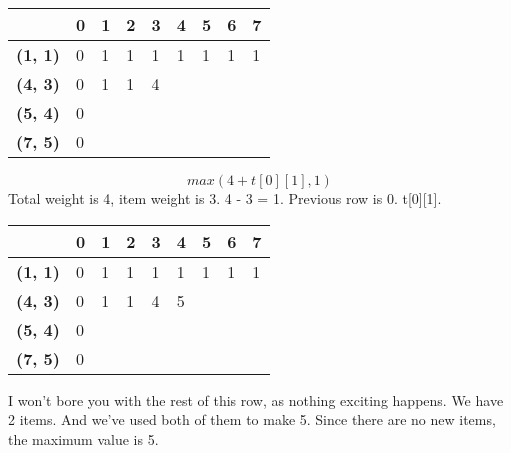 \documentclass{article}
\begin{document}
\begin{center}
\begin{tabular}{|l|l|l|l|l|l|l|l|l|}
\hline
                & \textbf{0} & \textbf{1} & \textbf{2} & \textbf{3} & \textbf{4} & \textbf{5} & \textbf{6} & \textbf{7} \\ \hline
\textbf{(1, 1)} & 0          &1            &1            &1            &1            &1            &1            &1            \\ \hline
\textbf{(4, 3)} & 0          &1            &1            &4            &            &            &            &            \\ \hline
\textbf{(5, 4)} & 0          &            &            &            &            &            &            &            \\ \hline
\textbf{(7, 5)} & 0          &            &            &            &            &            &            &            \\ \hline
\end{tabular}
\end{center}
$$max(4 + t[0][1], 1)$$
Total weight is 4, item weight is 3. 4 - 3 = 1. Previous row is 0. t[0][1].
\begin{center}
\begin{tabular}{|l|l|l|l|l|l|l|l|l|}
\hline
                & \textbf{0} & \textbf{1} & \textbf{2} & \textbf{3} & \textbf{4} & \textbf{5} & \textbf{6} & \textbf{7} \\ \hline
\textbf{(1, 1)} & 0          &1            &1            &1            &1            &1            &1            &1            \\ \hline
\textbf{(4, 3)} & 0          &1            &1            &4            &5            &            &            &            \\ \hline
\textbf{(5, 4)} & 0          &            &            &            &            &            &            &            \\ \hline
\textbf{(7, 5)} & 0          &            &            &            &            &            &            &            \\ \hline
\end{tabular}
\end{center}
I won't bore you with the rest of this row, as nothing exciting happens. We have 2 items. And we've used both of them to make 5. Since there are no new items, the maximum value is 5. 
\end{document}
